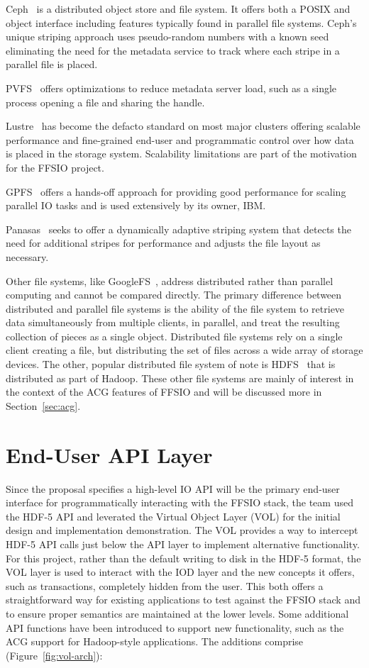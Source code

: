 \documentclass[conference]{IEEEtran}
\begin{document}
Ceph~\cite{weil:ceph} is a distributed object store and file system. It offers
both a POSIX and object interface including features typically found in parallel
file systems. Ceph's unique striping approach uses pseudo-random numbers with a
known seed eliminating the need for the metadata service to track where each
stripe in a parallel file is placed.

PVFS~\cite{carns:pvfs} offers optimizations to reduce metadata server load,
such as a single process opening a file and sharing the handle.

Lustre~\cite{braam:lustre-arch} has become the defacto standard on most major
clusters offering scalable performance and fine-grained end-user and programmatic control over how data is placed in the storage system. Scalability limitations are part of the motivation for the FFSIO project.

GPFS~\cite{schmuck:gpfs} offers a hands-off approach for providing good performance for scaling parallel IO tasks and is used extensively by its owner, IBM.

Panasas~\cite{panasas:architecture} seeks to offer a dynamically adaptive striping system that detects the need for additional stripes for performance and adjusts the file layout as necessary.

Other file systems, like GoogleFS~\cite{ghemawat:googlefs}, address distributed
rather than parallel computing and cannot be compared directly. The primary
difference between distributed and parallel file systems is the ability of the
file system to retrieve data simultaneously from multiple clients, in parallel,
and treat the resulting collection of pieces as a single object. Distributed
file systems rely on a single client creating a file, but distributing the set
of files across a wide array of storage devices. The other, popular distributed
file system of note is HDFS~\cite{Shvachko:2010:hdfs} that is distributed as
part of Hadoop. These other file systems are mainly of interest in the context
of the ACG features of FFSIO and will be discussed more in
Section~\ref{sec:acg}.

\section{End-User API Layer}
\label{sec:end-user}
Since the proposal specifies a high-level IO API will be the primary end-user
interface for programmatically interacting with the FFSIO stack, the team used
the HDF-5 API and leverated the Virtual Object Layer (VOL) for the initial
design and implementation demonstration. The VOL provides a way to intercept
HDF-5 API calls just below the API layer to implement alternative
functionality. For this project, rather than the default writing to disk in the
HDF-5 format, the VOL layer is used to interact with the IOD layer and the new
concepts it offers, such as transactions, completely hidden from the user.
This both offers a straightforward way for existing applications to test
against the FFSIO stack and to ensure proper semantics are maintained at the
lower levels. Some additional API functions have been introduced to support
new functionality, such as the ACG support for Hadoop-style applications.  The
additions comprise (Figure~\ref{fig:vol-arch}):
\end{document}
